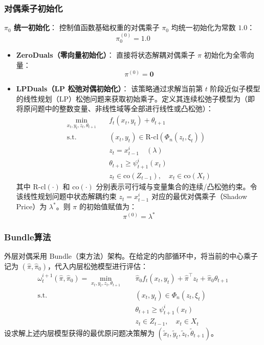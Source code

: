 \documentclass[11pt]{ctexart}
\begin{document}
\subsubsection{对偶乘子初始化}
\textbf{$\pi_0$ 统一初始化}：
    控制值函数基础权重的对偶乘子 $\pi_0$ 均统一初始化为常数 $1.0$：
    \begin{equation}
    \pi_0^{(0)} = 1.0
    \end{equation}
\begin{itemize}
    \item \textbf{ZeroDuals（零向量初始化）}：
    直接将状态解耦对偶乘子 $\pi$ 初始化为全零向量：
    \begin{equation}
    \pi^{(0)} = \mathbf{0}
    \end{equation}

    \item \textbf{LPDuals（LP 松弛对偶初始化）}：
    该策略通过求解当前第 $t$ 阶段近似子模型的线性规划（LP）松弛问题来获取初始乘子。定义其连续松弛子模型为（即将原问题中的整数变量、非线性域等全部进行线性或凸松弛）：
    \begin{align}
    \min_{x_t, y_t, z_t, \theta_{t+1}} \quad & f_{t}(x_{t}, y_{t}) + \theta_{t+1} \\
    \text{s.t.} \quad & (x_{t}, y_{t}) \in \text{R-cl}\left(\Phi_{n}(z_{t}, \xi_{t})\right) \\
    & z_{t} = x_{t-1}^i \quad \left( \lambda \right) \\
    & \theta_{t+1} \ge \psi_{t+1}^{i}(x_{t}) \\
    & z_{t} \in \text{co}(Z_{t-1}), \quad x_{t} \in \text{co}(X_{t})
    \end{align}
    其中 $\text{R-cl}(\cdot)$ 和 $\text{co}(\cdot)$ 分别表示可行域与变量集合的连续/凸松弛约束。令该线性规划问题中状态解耦约束 $z_{t} = x_{t-1}^i$ 对应的最优对偶乘子（Shadow Price）为 $\lambda^*$。则 $\pi$ 的初始值赋值为：
    \begin{equation}
    \pi^{(0)} = \lambda^*
    \end{equation}

\end{itemize}

\subsubsection{Bundle算法}
外层对偶采用 Bundle（束方法）架构。在给定的内部循环中，将当前的中心乘子记为 $(\hat{\pi}, \hat{\pi}_0)$，代入内层松弛模型进行评估：
\begin{align}
\omega_t^{i+1}(\hat{\pi}, \hat{\pi}_0) = \min_{x_t, y_t, z_t, \theta_{t+1}} \quad & \hat{\pi}_0 f_t(x_t, y_t) + \hat{\pi}^\top z_t + \hat{\pi}_0 \theta_{t+1} \\
\text{s.t.} \quad & (x_{t}, y_{t}) \in \Phi_{n}(z_{t}, \xi_{t}) \\
& \theta_{t+1} \ge \psi_{t+1}^{i}(x_{t}) \\
& z_{t} \in Z_{t-1}, \quad x_{t} \in X_{t}
\end{align}
设求解上述内层模型获得的最优原问题决策解为 $(\tilde{x}_t, \tilde{y}_t, \tilde{z}_t, \tilde{\theta}_{t+1})$。
\end{document}
